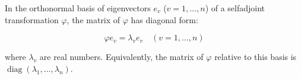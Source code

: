 In the orthonormal basis of eigenvectors $e_v$ ($v = 1, \ldots, n$) of a selfadjoint transformation $\varphi$, the matrix of $\varphi$ has diagonal form:

$$\varphi e_v = \lambda_v e_v \quad (v = 1, \ldots, n)$$

where $\lambda_v$ are real numbers. Equivalently, the matrix of $\varphi$ relative to this basis is $\operatorname{diag}(\lambda_1, \ldots, \lambda_n)$.

